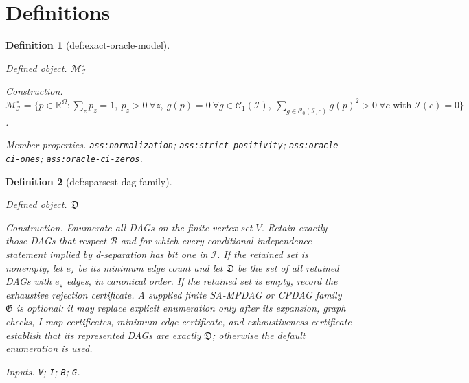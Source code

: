 \documentclass{article}
\newtheorem{definition}{Definition}
\begin{document}
\section{Definitions}

\begin{definition}[def:exact-oracle-model]\label{def:exact-oracle-model}
\par\smallskip\noindent\emph{Defined object.} \(\mathcal M_{\mathcal I}^{\circ}\)
\par\smallskip\noindent\emph{Construction.} \(\mathcal M_{\mathcal I}^{\circ}=\{p\in\mathbb R^{\Omega}: \sum_zp_z=1,\ p_z>0\ \forall z,\ g(p)=0\ \forall g\in\mathcal C_1(\mathcal I),\ \sum_{g\in\mathcal C_0(\mathcal I,c)}g(p)^2>0\ \forall c\text{ with }\mathcal I(c)=0\}\).
\par\smallskip\noindent\emph{Member properties.} \texttt{ass:\allowbreak{}normalization}; \texttt{ass:\allowbreak{}strict-\allowbreak{}positivity}; \texttt{ass:\allowbreak{}oracle-\allowbreak{}ci-\allowbreak{}ones}; \texttt{ass:\allowbreak{}oracle-\allowbreak{}ci-\allowbreak{}zeros}.
\end{definition}

\begin{definition}[def:sparsest-dag-family]\label{def:sparsest-dag-family}
\par\smallskip\noindent\emph{Defined object.} \(\mathfrak D\)
\par\smallskip\noindent\emph{Construction.} Enumerate all DAGs on the finite vertex set \(V\).  Retain exactly those DAGs that respect \(\mathcal B\) and for which every conditional-independence statement implied by d-separation has bit one in \(\mathcal I\).  If the retained set is nonempty, let \(e_\star\) be its minimum edge count and let \(\mathfrak D\) be the set of all retained DAGs with \(e_\star\) edges, in canonical order.  If the retained set is empty, record the exhaustive rejection certificate.  A supplied finite SA-MPDAG or CPDAG family \(\mathfrak G\) is optional: it may replace explicit enumeration only after its expansion, graph checks, I-map certificates, minimum-edge certificate, and exhaustiveness certificate establish that its represented DAGs are exactly \(\mathfrak D\); otherwise the default enumeration is used.
\par\smallskip\noindent\emph{Inputs.} \texttt{V}; \texttt{I}; \texttt{B}; \texttt{G}.
\end{definition}
\end{document}
